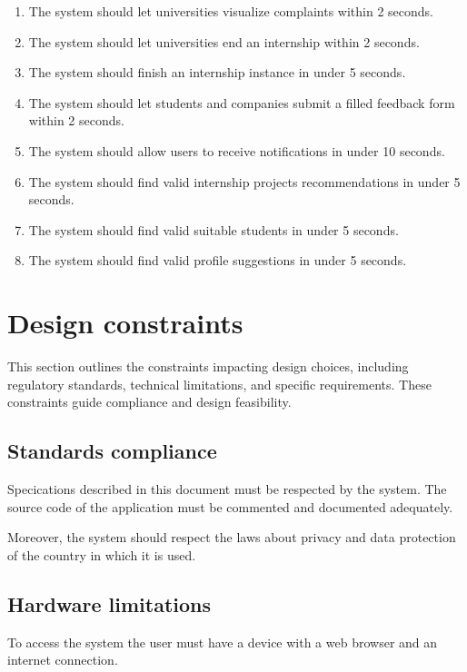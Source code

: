\begin{enumerate}[label=\textbf{SR\arabic* -}]
    \item The system should let universities visualize complaints within 2 seconds.
    \item The system should let universities end an internship within 2 seconds.
    \item The system should finish an internship instance in under 5 seconds.
    \item The system should let students and companies submit a filled feedback form within 2 seconds.
    \item The system should allow users to receive notifications in under 10 seconds.
    \item The system should find valid internship projects recommendations in under 5 seconds.
    \item The system should find valid suitable students in under 5 seconds.
    \item The system should find valid profile suggestions in under 5 seconds.
\end{enumerate}

\section{Design constraints}

This section outlines the constraints impacting design choices, including regulatory standards, technical limitations, and specific requirements.
These constraints guide compliance and design feasibility.

\subsection{Standards compliance}

Specications described in this document must be respected by the system.
The source code of the application must be commented and documented adequately.

Moreover, the system should respect the laws about privacy and data protection of the country in which it is used.

\subsection{Hardware limitations}

To access the system the user must have a device with a web browser and an internet connection.


